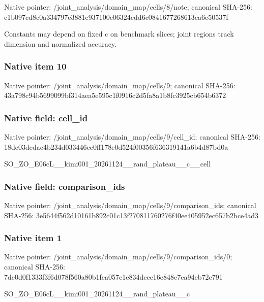 \documentclass[10pt,a4paper]{article}
\begin{document}
Native pointer: /joint\_analysis/domain\_map/cells/8/note; canonical SHA-256: c1b097cd8c0a334797e3881e\allowbreak{}937100c06324cdd6c0841677\allowbreak{}268613ca6c50537f


Constants may depend on fixed c on benchmark slices; joint regions track dimension and normalized accuracy.


\subsubsection{Native item 10}


Native pointer: /joint\_analysis/domain\_map/cells/9; canonical SHA-256: 43a798c94b5699099bf314ae\allowbreak{}a5e595c1f0916c2d5fa8a1b8\allowbreak{}fc3925cb654b6372



\subsubsection{Native field: cell\_id}


Native pointer: /joint\_analysis/domain\_m\allowbreak{}ap/cells/9/cell\_id; canonical SHA-256: 18de03dedac4b234d033446c\allowbreak{}e0ff178e0d524f00356f6363\allowbreak{}19141a6b4d87bd0a


SO\_ZO\_E06cL\_\_kimi001\_202\allowbreak{}61124\_\_rand\_plateau\_\_c\_\_\allowbreak{}cell


\subsubsection{Native field: comparison\_ids}


Native pointer: /joint\_analysis/domain\_m\allowbreak{}ap/cells/9/comparison\_id\allowbreak{}s; canonical SHA-256: 3e5644f562d10161b892c01c\allowbreak{}13f270811760276f40ee4059\allowbreak{}52ec657b2bce4ad3



\subsubsection{Native item 1}


Native pointer: /joint\_analysis/domain\_m\allowbreak{}ap/cells/9/comparison\_id\allowbreak{}s/0; canonical SHA-256: 7de0d0f1333f3f6d078f560a\allowbreak{}80b1fea057c1e834dcee16e8\allowbreak{}48e7ea94eb72c791


SO\_ZO\_E06cL\_\_kimi001\_202\allowbreak{}61124\_\_rand\_plateau\_\_c
\end{document}
